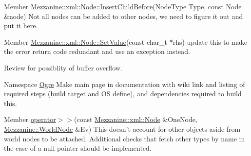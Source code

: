 \label{todo__todo000055}
\hypertarget{todo__todo000055}{}
 
\begin{DoxyDescription}
\item[Member \hyperlink{classMezzanine_1_1xml_1_1Node_a0f877b7c3d64ede9a73662ed2fff0ef5}{Mezzanine::xml::Node::InsertChildBefore}(NodeType Type, const Node \&node) ]Not all nodes can be added to other nodes, we need to figure it out and put it here. 
\end{DoxyDescription}

\label{todo__todo000054}
\hypertarget{todo__todo000054}{}
 
\begin{DoxyDescription}
\item[Member \hyperlink{classMezzanine_1_1xml_1_1Node_a86ca6281c21ba29a3e1476ac7cd5a48f}{Mezzanine::xml::Node::SetValue}(const char\_\-t $\ast$rhs) ]update this to make the error return code redundant and use an exception instead. 

Review for possiblity of buffer overflow. 
\end{DoxyDescription}

\label{todo__todo000011}
\hypertarget{todo__todo000011}{}
 
\begin{DoxyDescription}
\item[Namespace \hyperlink{namespaceOgre}{Ogre} ]Make main page in documentation with wiki link and listing of required steps (build target and OS define), and dependencies required to build this. 
\end{DoxyDescription}

\label{todo__todo000045}
\hypertarget{todo__todo000045}{}
 
\begin{DoxyDescription}
\item[Member \hyperlink{worldnode_8h_a6509ccb839197be1acefdc54e46a62fe}{operator$>$$>$}(const \hyperlink{classMezzanine_1_1xml_1_1Node}{Mezzanine::xml::Node} \&OneNode, \hyperlink{classMezzanine_1_1WorldNode}{Mezzanine::WorldNode} \&Ev) ]This doesn't account for other objects aside from world nodes to be attached. Additional checks that fetch other types by name in the case of a null pointer should be implemented. 
\end{DoxyDescription}